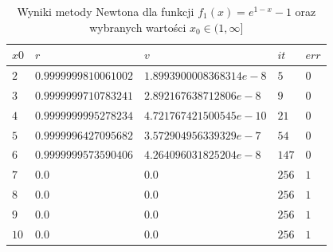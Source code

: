 \documentclass[11pt]{article}
\begin{document}
        \begin{table}[h!]
        \centering
        \begin{tabularx}{0.63\textwidth}{l l l l l }
            \hline
            $x0$ & $r$ & $v$ & $it$ & $err$ \\
            \hline
            $2$ & $0.9999999810061002$ & $1.8993900008368314e-8$ & $5$ & $0$ \\
            $3$ & $0.9999999710783241$ & $2.892167638712806e-8$ & $9$ & $0$ \\
            $4$ & $0.9999999995278234$ & $4.721767421500545e-10$ & $21$ & $0$ \\
            $5$ & $0.9999996427095682$ & $3.572904956339329e-7$ & $54$ & $0$ \\
            $6$ & $0.9999999573590406$ & $4.264096031825204e-8$ & $147$ & $0$ \\
            $7$ & $0.0$ & $0.0$ & $256$ & $1$ \\
            $8$ & $0.0$ & $0.0$ & $256$ & $1$ \\
            $9$ & $0.0$ & $0.0$ & $256$ & $1$ \\
            $10$ & $0.0$ & $0.0$ & $256$ & $1$ \\
            \hline
        \end{tabularx}
        \label{table:ex6_newton_f1}
        \caption{Wyniki metody Newtona dla funkcji $f_1(x) = e^{1 - x} - 1$ oraz wybranych wartości $x_0 \in (1, \infty]$}
        \end{table}
\end{document}

